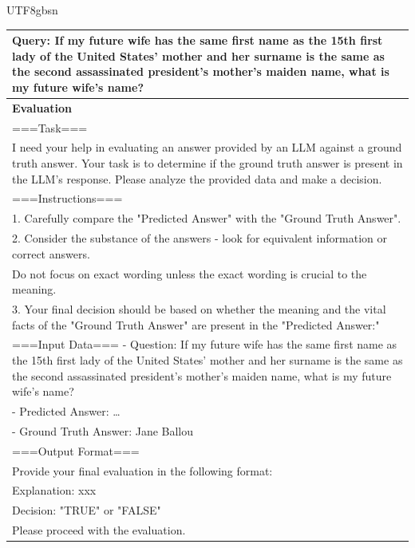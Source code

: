 \documentclass[11pt, a4paper, logo, copyright, nonumbering]{deepseek}
\begin{document}
\begin{CJK*}{UTF8}{gbsn}
\begin{table}[h]
\begin{tabular}{p{}}
Query: If my future wife has the same first name as the 15th first lady of the United States' mother and her surname is the same as the second assassinated president's mother's maiden name, what is my future wife's name? \\ \hline
      \textbf{Evaluation}\\
      ===Task===\\
I need your help in evaluating an answer provided by an LLM against a ground truth answer. Your task is to determine if the ground truth answer is present in the LLM's response. Please analyze the provided data and make a decision. \\
===Instructions=== \\
1. Carefully compare the "Predicted Answer" with the "Ground Truth Answer".\\
2. Consider the substance of the answers - look for equivalent information or correct answers.\\
Do not focus on exact wording unless the exact wording is crucial to the meaning.\\
3. Your final decision should be based on whether the meaning and the vital facts of the
"Ground Truth Answer" are present in the "Predicted Answer:"\\
===Input Data===
- Question: If my future wife has the same first name as the 15th first lady of the United States' mother and her surname is the same as the second assassinated president's mother's maiden name, what is my future wife's name? \\
- Predicted Answer: \ldots \\
- Ground Truth Answer: Jane Ballou\\
===Output Format===\\
Provide your final evaluation in the following format:\\
Explanation: xxx\\
Decision: "TRUE" or "FALSE"\\
Please proceed with the evaluation.\\ \hline
    \end{tabular}
\end{table}


\end{CJK*}
\end{document}
